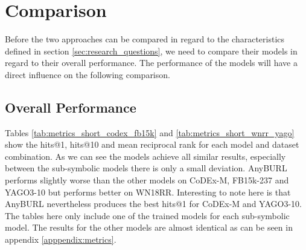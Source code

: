 \chapter{Comparison}
\label{cha:comparison}
Before the two approaches can be compared in regard to the characteristics defined in section \ref{sec:research_questions}, we need to compare their models in regard to their overall performance. The performance of the models will have a direct influence on the following comparison. 

\section{Overall Performance}

Tables \ref{tab:metrics_short_codex_fb15k} and \ref{tab:metrics_short_wnrr_yago} show the hits@1, hits@10 and mean reciprocal rank for each model and dataset combination. As we can see the models achieve all similar results, especially between the sub-symbolic models there is only a small deviation. AnyBURL performs slightly worse than the other models on CoDEx-M, FB15k-237 and YAGO3-10 but performs better on WN18RR. Interesting to note here is that AnyBURL nevertheless produces the best hits@1 for CoDEx-M and YAGO3-10. The tables here only include one of the trained models for each sub-symbolic model. The results for the other models are almost identical as can be seen in appendix \ref{apppendix:metrics}.

